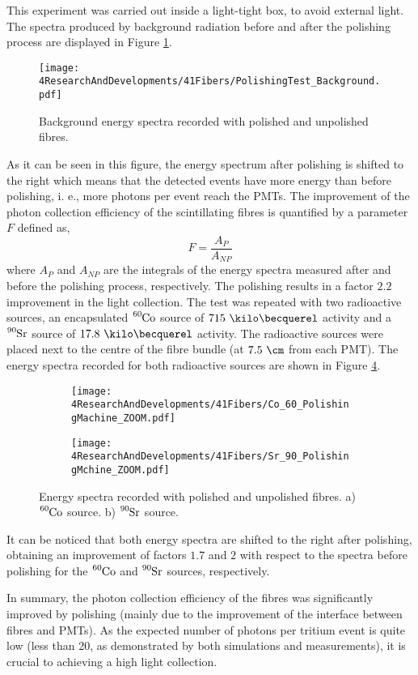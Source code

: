 This experiment was carried out inside a light-tight box, to avoid external light. The spectra produced by background radiation before and after the polishing process are displayed in Figure \ref{fig:ResultsOfPolishingMachineBackground}.
\begin{figure}[]
\centering
\texttt{[image: 4ResearchAndDevelopments/41Fibers/PolishingTest\_Background.pdf]}
\caption{Background energy spectra recorded with polished and unpolished fibres.\label{fig:ResultsOfPolishingMachineBackground}}
\end{figure}
As it can be seen in this figure, the energy spectrum after polishing is shifted to the right which means that the detected events have more energy than before polishing, i. e., more photons per event reach the PMTs. The improvement of the photon collection efficiency of the scintillating fibres is quantified by a parameter $F$ defined as,
\begin{equation}
F=\frac{A_{P}}{A_{NP}}
\label{eq:RelativeImprovement}
\end{equation}
where $A_{P}$ and $A_{NP}$ are the integrals of the energy spectra measured after and before the polishing process, respectively. The polishing results in a factor $2.2$ improvement in the light collection. The test was repeated with two radioactive sources, an encapsulated $\ce{^{60}Co}$ source of $715~\kilo\becquerel$ activity and a $\ce{^{90}Sr}$ source of $17.8~\kilo\becquerel$ activity. The radioactive sources were placed next to the centre of the fibre bundle (at $7.5~\cm$ from each PMT). The energy spectra recorded for both radioactive sources are shown in Figure \ref{fig:ResultsOfPolishingMachineSources}.
\begin{figure}
\centering
    \begin{subfigure}[b]{1\textwidth}
    \centering
    \texttt{[image: 4ResearchAndDevelopments/41Fibers/Co\_60\_PolishingMachine\_ZOOM.pdf]}  
    \caption{\label{subfig:EnergySpectrumCo60PolishingTest}}
    \end{subfigure}
    \hfill
    \begin{subfigure}[b]{1\textwidth}
    \centering
    \texttt{[image: 4ResearchAndDevelopments/41Fibers/Sr\_90\_PolishingMchine\_ZOOM.pdf]}  
    \caption{\label{subfig:EnergySpectrumSr90PolishingTest}}
    \end{subfigure}
 \caption{Energy spectra recorded with polished and unpolished fibres. a) $\ce{^{60}Co}$ source. b) $\ce{^{90}Sr}$ source.}
 \label{fig:ResultsOfPolishingMachineSources}
\end{figure}
It can be noticed that both energy spectra are shifted to the right after polishing, obtaining an improvement of factors $1.7$ and $2$ with respect to the spectra before polishing for the $\ce{^{60}Co}$ and $\ce{^{90}Sr}$ sources, respectively. 

In summary, the photon collection efficiency of the fibres was significantly improved by polishing (mainly due to the improvement of the interface between fibres and PMTs). As the expected number of photons per tritium event is quite low (less than 20, as demonstrated by both simulations and measurements), it is crucial to achieving a high light collection.